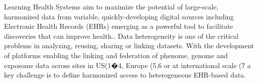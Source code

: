 \documentclass{amia}
\begin{document}
%
%
%

Learning Health Systems aim to maximize the potential of large-scale, harmonized data from variable, quickly-developing digital sources including Electronic Health Records (EHRs) emerging as a powerful tool to facilitate discoveries that can improve health.. Data heterogeneity is one of the critical problems in analyzing, reusing, sharing or linking datasets. With the development of platforms enabling the linking and federation of phenome, genome and exposome data across sites  in US(1�4, Europe (5,6 or at international scale (7 a key challenge is to define harmonized access to heterogeneous EHR-based data.
\end{document}
